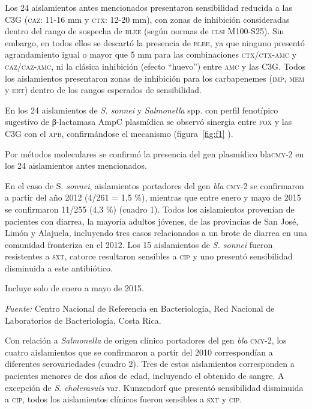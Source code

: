 \documentclass{article}
\begin{document}
Los 24 aislamientos antes mencionados presentaron sensibilidad reducida a las
C3G (\textsc{caz}: 11-16 mm y \textsc{ctx}: 12-20 mm), con zonas de inhibición consideradas dentro
del rango de sospecha de \textsc{blee} (según normas de \textsc{clsi} M100-S25). Sin embargo, en
todos ellos se descartó la presencia de \textsc{blee}, ya que ninguno presentó
agrandamiento igual o mayor que 5 mm para las combinaciones \textsc{ctx}/\textsc{ctx}-\textsc{amc} y
\textsc{caz}/\textsc{caz}-\textsc{amc}, ni la clásica inhibición (efecto “huevo”) entre \textsc{amc} y las C3G.
Todos los aislamientos presentaron zonas de inhibición para los carbapenemes
(\textsc{imp}, \textsc{mem} y \textsc{ert}) dentro de los rangos esperados de sensibilidad.

En los 24 aislamientos de \textit{S. sonnei}
y \textit{Salmonella}
spp. con perfil fenotípico sugestivo de β-lactamasa AmpC plasmídica se observó
sinergia entre \textsc{fox} y las C3G con el \textsc{apb}, confirmándose el mecanismo (figura~\ref{fig:f1}
).

Por métodos moleculares se confirmó la presencia del gen plasmídico bla\textsc{cmy}-2 en
los 24 aislamientos antes mencionados.

En el caso de S. \textit{sonnei}, aislamientos portadores del gen \textit{bla}
\textsc{cmy}-2 se confirmaron a partir del año 2012 (4/261 = 1,5 \%), mientras que entre
enero y mayo de 2015 se confirmaron 11/255 (4,3 \%) (cuadro 1). Todos los
aislamientos provenían de pacientes con diarrea, la mayoría adultos jóvenes, de
las provincias de San José, Limón y Alajuela, incluyendo tres casos relacionados
a un brote de diarrea en una comunidad fronteriza en el 2012. Los 15
aislamientos de \textit{S. sonnei}
fueron resistentes a \textsc{sxt}, catorce resultaron sensibles a \textsc{cip} y uno presentó
sensibilidad disminuida a este antibiótico.

Incluye solo de enero a mayo de 2015.

\textit{Fuente:}
Centro Nacional de Referencia en Bacteriología, Red Nacional de Laboratorios de
Bacteriología, Costa Rica.

Con relación a \textit{Salmonella}
de origen clínico portadores del gen \textit{bla}
\textsc{cmy}-2, los cuatro aislamientos que se confirmaron a partir del 2010
correspondían a diferentes serovariedades (cuadro 2). Tres de estos aislamientos
corresponden a pacientes menores de dos años de edad, incluyendo el obtenido de
sangre. A excepción de \textit{S}. \textit{cholerasuis}
var. Kunzendorf que presentó sensibilidad disminuida a \textsc{cip}, todos los
aislamientos clínicos fueron sensibles a \textsc{sxt} y \textsc{cip}.
\end{document}
